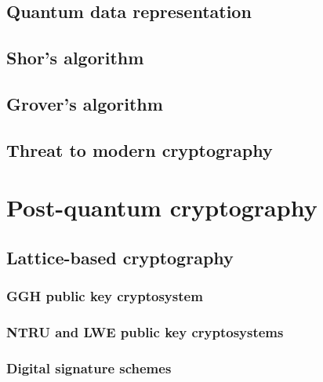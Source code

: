 \section{Quantum data representation}
\label{sec:quantum_data_repr}


\section{Shor's algorithm}
\label{sec:shors_algorithm}


\section{Grover's algorithm}
\label{sec:grovers_alg}


\section{Threat to modern cryptography}
\label{sec:threat_to_modern}


\chapter{Post-quantum cryptography}
\label{ch:pq_crypto}


\section{Lattice-based cryptography}
\label{sec:lattice_based_crypto}


\subsection{GGH public key cryptosystem}
\label{subsec:ggh}


\subsection{NTRU and LWE public key cryptosystems}
\label{subsec:ntru_lwe}


\subsection{Digital signature schemes}
\label{subsec:lattice_digital_schemes}


